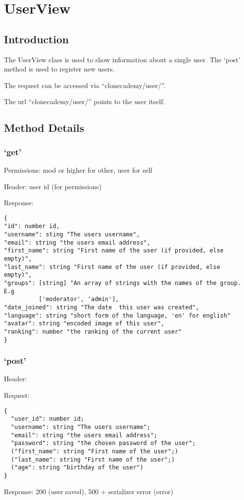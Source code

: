 \chapter*{UserView}

\section*{Introduction}\label{introduction}

The UserView class is used to show information about a single user. The
`post' method is used to register new users.

The request can be accessed via ``clonecademy/user/''.

The url ``clonecademy/user/'' points to the user itself.

\section*{Method Details}\label{method-details}

\subsection*{\texorpdfstring{`get'}{get}}\label{get}

Permissions: mod or higher for other, user for self

Header: user id (for permissions)

Response:

\begin{verbatim}
{
"id": number id,
"username": sting "The users username",
"email": string "the users email address",
"first_name": string "First name of the user (if provided, else empty)",
"last_name": string "First name of the user (if provided, else empty)",
"groups": [string] "An array of strings with the names of the group. E.g 
          ['moderator', 'admin'],
"date_joined": string "The date  this user was created",
"language": string "short form of the language, 'en' for english"
"avatar": string "encoded image of this user",
"ranking": number "the ranking of the current user"
}
\end{verbatim}

\subsection*{\texorpdfstring{`post'}{post}}\label{post}

Header:

Request:

\begin{verbatim}
{
  "user_id": number id;
  "username": string "The users username";
  "email": string "the users email address";
  "password": string "the chosen password of the user";
  ("first_name": string "First name of the user";)
  ("last_name": string "First name of the user";)
  ("age": string "birthday of the user")
}
\end{verbatim}

Response: 200 (user saved), 500 + serializer error (error)

